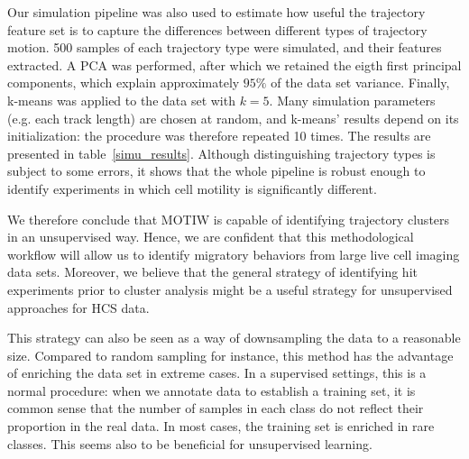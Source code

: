 Our simulation pipeline was also used to estimate how useful the trajectory feature set is to capture the differences between different types of trajectory motion. %
500 samples of each trajectory type were simulated, and their features
extracted. A PCA was performed, after which we retained the eigth
first principal components, which explain approximately $95\%$ of the
data set variance. Finally, k-means was applied to the data set with
$k=5$. Many simulation parameters (e.g. each track length) are chosen
at random, and k-means' results depend on its initialization: the
procedure was therefore repeated 10 times. The results are presented
in table~\ref{simu_results}. Although distinguishing trajectory types
is subject to some errors, it shows that the whole pipeline is robust
enough to identify experiments in which cell motility is significantly
different. 

We therefore conclude that MOTIW is capable of identifying trajectory
clusters in an unsupervised way. Hence, we are confident that this
methodological workflow will allow us to identify migratory behaviors
from large live cell imaging data sets. Moreover, we believe that the general
strategy of identifying hit experiments prior to cluster analysis
might be a useful strategy for unsupervised approaches for HCS
data. 

This strategy can also be seen as a way of downsampling the data to a
reasonable size. Compared to random sampling for instance, this method
has the advantage of enriching the data set in extreme cases. In a
supervised settings, this is a normal procedure: when we annotate data
to establish a training set, it is common sense that the number of
samples in each class do not reflect their proportion in the real
data. In most cases, the training set is enriched in rare
classes. This seems also to be beneficial for unsupervised learning. 



